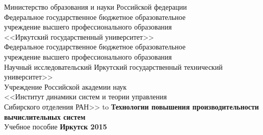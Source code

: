 \documentclass[14pt, openany, twoside, draft]{extbook} %
\begin{document}

\renewcommand{\chaptername}{} %
\renewcommand{\refname}{Рекомендуемая литература} %
\renewcommand{\bibname}{\refname}
\begin{titlepage}
\thispagestyle{empty}
\begin{center}{\small{}
Министерство образования и науки
Российской федерации \\
Федеральное государственное бюджетное образовательное\\
учреждение высшего профессионального образования\\
<<Иркутский государственный университет>>\\[2ex]
Федеральное государственное бюджетное образовательное\\
учреждение высшего профессионального образования\\
Научный исследовательский Иркутский государственный технический университет>>\\[2ex]
    Учреждение Российской академии наук \\
<<Институт динамики систем и теории управления \\
Сибирского отделения РАН>>
}
\vfill
\hbox to \linewidth{\hfill\bfseries Е.~А.~Черкашин, В.~О.~Обризан\hfill}
 \vspace{2em}
{\large\bfseries Технологии повышения производительности вычислительных систем}\\
 \vspace{2em}
{Учебное пособие}
\vfill
\vfill
 \textbf{Иркутск 2015}
\end{center}
\end{titlepage}
\end{document}

